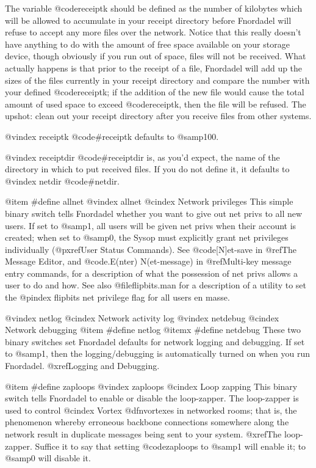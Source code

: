The variable @code{receiptk} should be defined as the
number of kilobytes which will be allowed to accumulate in
your receipt directory before Fnordadel will refuse to
accept any more files over the network.  Notice that this
really doesn't have anything to do with the amount of free
space available on your storage device, though obviously
if you run out of space, files will not be received.  What
actually happens is that prior to the receipt of a file,
Fnordadel will add up the sizes of the files currently
in your receipt directory and compare the number with
your defined @code{receiptk}; if the addition of the new file
would cause the total amount of used space to
exceed @code{receiptk}, then the file will be refused.
The upshot: clean out your receipt directory after you
receive files from other systems.

@vindex receiptk
@code{#receiptk} defaults to @samp{100}.

@vindex receiptdir
@code{#receiptdir} is, as you'd expect, the name of the
directory in which to put received files.  If you do not
define it, it defaults to
@vindex netdir
@code{#netdir}.

@item #define allnet
@vindex allnet
@cindex Network privileges
This simple binary switch tells Fnordadel whether
you want to give out net privs to all new users.  If set
to @samp{1}, all users will be given net privs when their account
is created; when set to @samp{0}, the Sysop must explicitly grant
net privileges individually (@pxref{User Status Commands}).
See @code{[N]et-save} in @ref{The Message Editor}, and
@code{.E(nter) N(et-message)} in @ref{Multi-key message entry commands}, for
a description of what the possession of net privs allows a user to do and how.
See also @file{flipbits.man} for a description of a utility to set the
@pindex flipbits
net privilege flag for all users en masse.

@vindex netlog
@cindex Network activity log
@vindex netdebug
@cindex Network debugging
@item #define netlog
@itemx #define netdebug
These two binary switches set Fnordadel defaults
for network logging and debugging.  If set to @samp{1}, then the
logging/debugging is automatically turned on when you run
Fnordadel.  @xref{Logging and Debugging}.

@item #define zaploops
@vindex zaploops
@cindex Loop zapping
This binary switch tells Fnordadel to enable or
disable the loop-zapper.  The loop-zapper is used to
control
@cindex Vortex
@dfn{vortexes} in networked rooms; that is, the
phenomenon whereby erroneous backbone connections
somewhere along the network result in duplicate messages
being sent to your system.  @xref{The loop-zapper}.
Suffice it to say that
setting @code{zaploops} to @samp{1} will enable it; to @samp{0} will disable
it.

